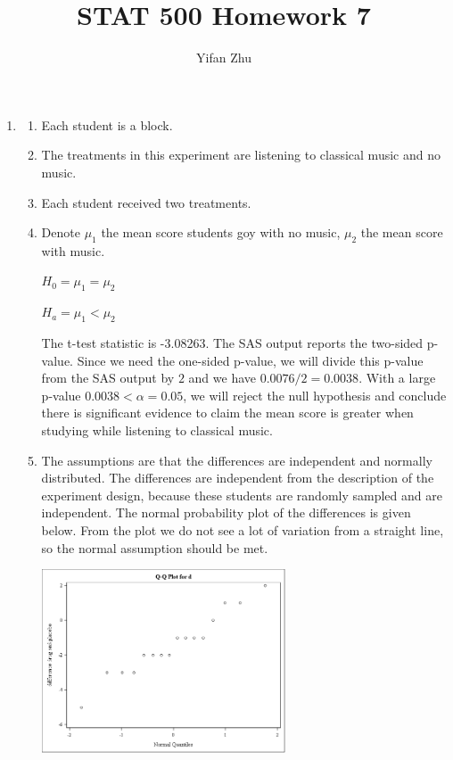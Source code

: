 \documentclass{article}
\begin{document}
	

	
	\title{STAT 500 Homework 7}
	\author{Yifan Zhu}
	\maketitle
	
	\begin{enumerate}[leftmargin = 0 em, label = \arabic*., font = \bfseries]
	\item
	\begin{enumerate}
		\item Each student is a block.
		\item The treatments in this experiment are listening to classical music and no music.
		\item Each student received two treatments.
		\item Denote $\mu_{1}$ the mean score students goy with no music, $\mu_2$ the mean score with music.

		$H_0 = \mu_1 = \mu_2$

		$H_a = \mu_1 < \mu_2$

		The t-test statistic is -3.08263. The SAS output reports the two-sided p-value.
Since we need the one-sided p-value, we will divide this p-value from the SAS
output by $2$ and we have $0.0076 / 2 = 0.0038$.
With a large p-value $0.0038 < \alpha = 0.05$, we will reject the null hypothesis and conclude there is significant evidence to claim the mean score is greater when studying while listening to classical music.

\item The assumptions are that the differences are independent and normally
distributed. The differences are independent from the description of the experiment design, because these students are randomly sampled and are independent. The normal probability plot of the differences is given below. From the plot we do not see a lot of variation from a straight line, so the normal assumption should be met.

\begin{center}
\includegraphics[width = 0.6\textwidth]{qqplot.png}
\end{center}


\end{enumerate}
\end{enumerate}
\end{document}

